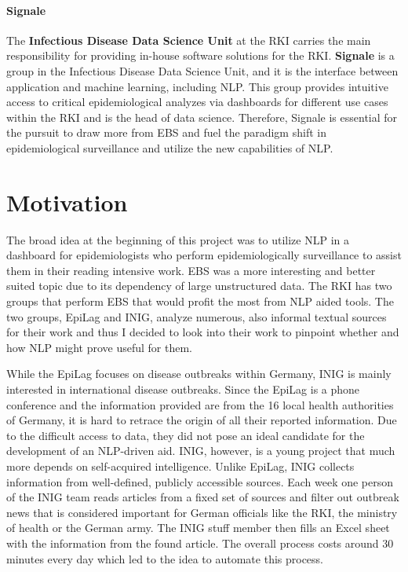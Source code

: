 \paragraph{Signale}
The \textbf{Infectious Disease Data Science Unit} at the RKI carries the main responsibility for providing in-house software solutions for the RKI.
\textbf{Signale} is a group in the Infectious Disease Data Science Unit, and it is the interface between application and machine learning, including NLP.
This group provides intuitive access to critical epidemiological analyzes via dashboards for different use cases within the RKI and is the head of data science.
Therefore, Signale is essential for the pursuit to draw more from EBS and fuel the paradigm shift in epidemiological surveillance and utilize the new capabilities of NLP.


\section{Motivation}
The broad idea at the beginning of this project was to utilize NLP in a dashboard for epidemiologists who perform epidemiologically
surveillance to assist them in their reading intensive work.
EBS was a more interesting and better suited topic due to its dependency of large unstructured data.
The RKI has two groups that perform EBS that would profit the most from NLP aided tools. The two groups, EpiLag and INIG, analyze numerous, also informal textual sources for their work and thus I decided to look into their work to pinpoint whether and how NLP might prove useful for them.

While the EpiLag focuses on disease outbreaks within Germany, INIG is mainly interested in international disease outbreaks. Since the EpiLag is a phone conference and the information provided are from the 16 local health authorities of Germany, it is hard to retrace the origin of all their reported information.
Due to the difficult access to data, they did not pose an ideal candidate for the development of an NLP-driven aid.
INIG, however, is a young project that much more depends on self-acquired intelligence.
Unlike EpiLag, INIG collects information from well-defined, publicly accessible sources.
Each week one person of the INIG team reads articles from a fixed set of sources and filter out outbreak news that is considered important for German officials like the RKI, the ministry of health or the German army.
The INIG stuff member then fills an Excel sheet with the information from the found article.
The overall process costs around 30 minutes every day which led to the idea to automate this process.

